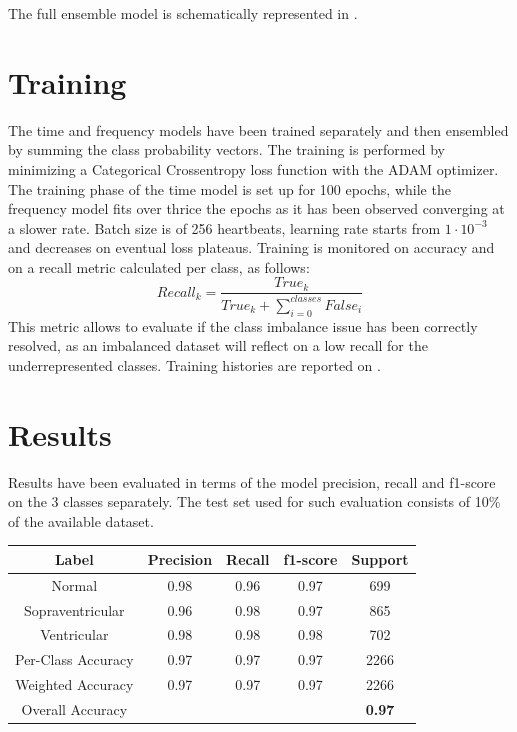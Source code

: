 \documentclass[conference]{IEEEtran}
\begin{document}
    The full ensemble model is schematically represented in
    .

\section{Training}
    The time and frequency models have been trained separately and
    then ensembled by summing the class probability vectors. The
    training is performed by minimizing a Categorical Crossentropy
    loss function with the ADAM optimizer. The training phase of the
    time model is set up for 100 epochs, while the frequency model
    fits over thrice the epochs as it has been observed converging at
    a slower rate. Batch size is of 256 heartbeats, learning rate
    starts from $1\cdot10^{-3}$ and decreases on eventual loss
    plateaus. Training is monitored on accuracy and on a recall metric
    calculated per class, as follows:
    \begin{equation}
        Recall_k=\frac{True_k}{True_k+\sum_{i=0}^{classes}False_i}
    \end{equation}
    This metric allows to evaluate if the class imbalance issue has
    been correctly resolved, as an imbalanced dataset will reflect on
    a low recall for the underrepresented classes. Training histories
    are reported on .

\section{Results}
    Results have been evaluated in terms of the model precision,
    recall and f1-score on the 3 classes separately. The test set used
    for such evaluation consists of 10\% of the available dataset.
    
    \begin{center}
        \begin{tabular}{||c|c c c c||}
            \hline
            Label & Precision & Recall & f1-score & Support\\
            \hline \hline
        
            Normal& 0.98&0.96&0.97&699\\
            \hline
            Sopraventricular& 0.96&0.98&0.97&865\\
            \hline
            Ventricular& 0.98&0.98&0.98&702\\
            \hline\hline
        
            Per-Class Accuracy &0.97&0.97&0.97&2266\\
            \hline
            Weighted Accuracy &0.97&0.97&0.97&2266\\
            \hline
            Overall Accuracy&&&&\textbf{0.97}\\
            \hline
        \end{tabular}
    \end{center}
\end{document}
